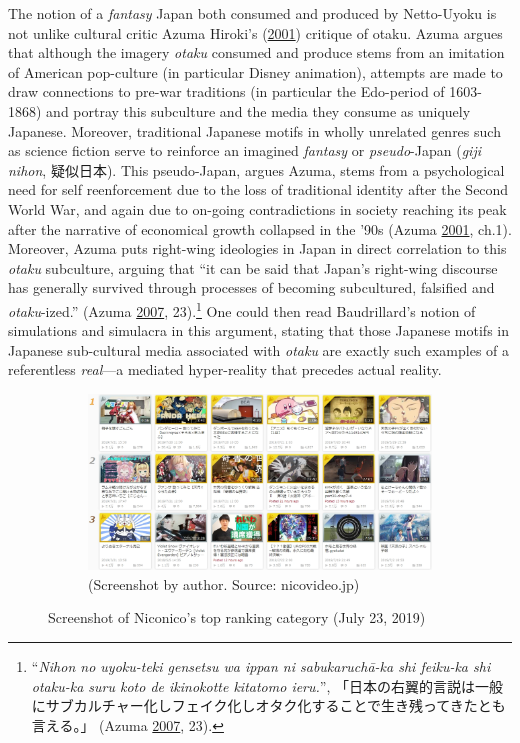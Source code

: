 \documentclass[10pt,british,A4paper,,openany]{memoir}
\begin{document}
The notion of a \emph{fantasy} Japan both consumed and produced by
Netto-Uyoku is not unlike cultural critic Azuma Hiroki's
(\protect\hyperlink{ref-azuma_otaku:_2001}{2001}) critique of otaku.
Azuma argues that although the imagery \emph{otaku} consumed and produce
stems from an imitation of American pop-culture (in particular Disney
animation), attempts are made to draw connections to pre-war traditions
(in particular the Edo-period of 1603-1868) and portray this subculture
and the media they consume as uniquely Japanese. Moreover, traditional
Japanese motifs in wholly unrelated genres such as science fiction serve
to reinforce an imagined \emph{fantasy} or \emph{pseudo}-Japan
(\emph{giji nihon}, 疑似日本). This pseudo-Japan, argues Azuma, stems
from a psychological need for self reenforcement due to the loss of
traditional identity after the Second World War, and again due to
on-going contradictions in society reaching its peak after the narrative
of economical growth collapsed in the '90s (Azuma
\protect\hyperlink{ref-azuma_otaku:_2001}{2001}, ch.1). Moreover, Azuma
puts right-wing ideologies in Japan in direct correlation to this
\emph{otaku} subculture, arguing that ``it can be said that Japan's
right-wing discourse has generally survived through processes of
becoming subcultured, falsified and \emph{otaku}-ized.'' (Azuma
\protect\hyperlink{ref-azuma__2007}{2007}, 23).\footnote{``\emph{Nihon
  no uyoku-teki gensetsu wa ippan ni sabukaruchā-ka shi feiku-ka shi
  otaku-ka suru koto de ikinokotte kitatomo ieru.}'',
  「日本の右翼的言説は一般にサブカルチャー化しフェイク化しオタク化することで生き残ってきたとも言える。」
  (Azuma \protect\hyperlink{ref-azuma__2007}{2007}, 23).} One could then
read Baudrillard's notion of simulations and simulacra in this argument,
stating that those Japanese motifs in Japanese sub-cultural media
associated with \emph{otaku} are exactly such examples of a referentless
\emph{real}---a mediated hyper-reality that precedes actual reality.

\begin{figure}[!htb]
 \centering
 \begin{subfigure}[b]{0.75\textwidth}
  \includegraphics[width=\textwidth]{images/2channel/niconico.jpg}
  \caption*{(Screenshot by author. Source: nicovideo.jp)}
  \label{fig:nicotop}
 \end{subfigure}
 \caption{Screenshot of Niconico's top ranking category (July 23, 2019)}\label{fig:aa}
\end{figure}
\end{document}
